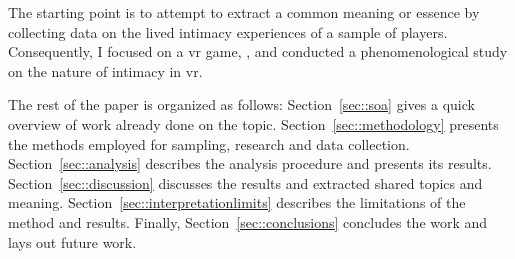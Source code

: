 The starting point is to attempt to extract a common meaning or essence by collecting data on the lived intimacy experiences of a sample of players. 
Consequently, I focused on a \gls{vr} game, \vrc, and conducted a phenomenological study on the nature of intimacy in \gls{vr}.

 The rest of the paper is organized as follows:
Section~\ref{sec::soa} gives a quick overview of work already done on the topic.
Section~\ref{sec::methodology} presents the methods employed for sampling, research and data collection.
Section~\ref{sec::analysis} describes the analysis procedure and presents its results.
Section~\ref{sec::discussion} discusses the results and extracted shared topics and meaning.
Section~\ref{sec::interpretationlimits} describes the limitations of the method and results.
Finally, Section~\ref{sec::conclusions} concludes the work and lays out future work.